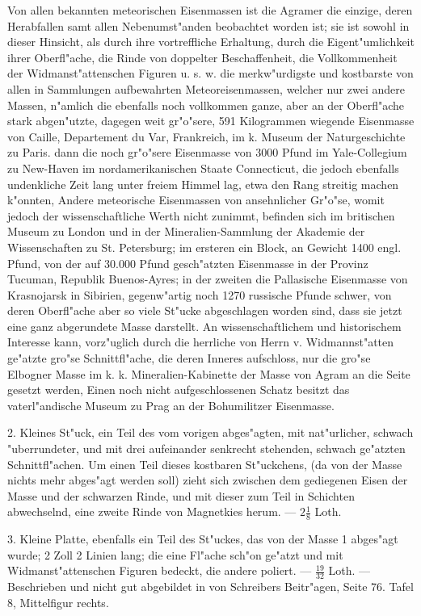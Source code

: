 \documentclass[a4paper, 11pt, oneside, polutonikogreek, german]{article}
\begin{document}
Von allen bekannten meteorischen Eisenmassen ist die Agramer die einzige, deren Herabfallen samt allen Nebenumst"anden beobachtet worden ist; sie ist sowohl in dieser Hinsicht, als durch ihre vortreffliche Erhaltung, durch die Eigent"umlichkeit ihrer Oberfl"ache, die Rinde von doppelter Beschaffenheit, die Vollkommenheit der Widmanst"attenschen Figuren u. s. w. die merkw"urdigste und kostbarste von allen in Sammlungen aufbewahrten Meteoreisenmassen, welcher nur zwei andere Massen, n"amlich die ebenfalls noch vollkommen ganze, aber an der Oberfl"ache stark abgen"utzte, dagegen weit gr"o"sere, 591 Kilogrammen wiegende Eisenmasse von Caille, Departement du Var, Frankreich, im k. Museum der Naturgeschichte zu Paris. dann die noch gr"o"sere Eisenmasse von 3000 Pfund im Yale-Collegium zu New-Haven im nordamerikanischen Staate Connecticut, die jedoch ebenfalls undenkliche Zeit lang unter freiem Himmel lag, etwa den Rang streitig machen k"onnten, Andere meteorische Eisenmassen von ansehnlicher Gr"o"se, womit jedoch der wissenschaftliche Werth nicht zunimmt, befinden sich im britischen Museum zu London und in der Mineralien-Sammlung der Akademie der Wissenschaften zu St. Petersburg; im ersteren ein Block, an Gewicht 1400 engl. Pfund, von der auf 30.000 Pfund gesch"atzten Eisenmasse in der Provinz Tucuman, Republik Buenos-Ayres; in der zweiten die Pallasische Eisenmasse von Krasnojarsk in Sibirien, gegenw"artig noch 1270 russische Pfunde schwer, von deren Oberfl"ache aber so viele St"ucke abgeschlagen worden sind, dass sie jetzt eine ganz abgerundete Masse darstellt. An wissenschaftlichem und historischem Interesse kann, vorz"uglich durch die herrliche von Herrn v. Widmannst"atten ge"atzte gro"se Schnittfl"ache, die deren Inneres aufschloss, nur die gro"se Elbogner Masse im k. k. Mineralien-Kabinette der Masse von Agram an die Seite gesetzt werden, Einen noch nicht aufgeschlossenen Schatz besitzt das vaterl"andische Museum zu Prag an der Bohumilitzer Eisenmasse.

2. Kleines St"uck, ein Teil des vom vorigen abges"agten, mit nat"urlicher, schwach "uberrundeter, und mit drei aufeinander senkrecht stehenden, schwach ge"atzten Schnittfl"achen. Um einen Teil dieses kostbaren St"uckchens, (da von der Masse nichts mehr abges"agt werden soll) zieht sich zwischen dem gediegenen Eisen der Masse und der schwarzen Rinde, und mit dieser zum Teil in Schichten abwechselnd, eine zweite Rinde von Magnetkies herum. --- $2\frac{1}{8}$ Loth.

3. Kleine Platte, ebenfalls ein Teil des St"uckes, das von der Masse 1 abges"agt wurde; 2 Zoll 2 Linien lang; die eine Fl"ache sch"on ge"atzt und mit Widmanst"attenschen Figuren bedeckt, die andere poliert. --- $\frac{19}{32}$ Loth. --- Beschrieben und nicht gut abgebildet in von Schreibers Beitr"agen, Seite 76. Tafel 8, Mittelfigur rechts.
\end{document}
